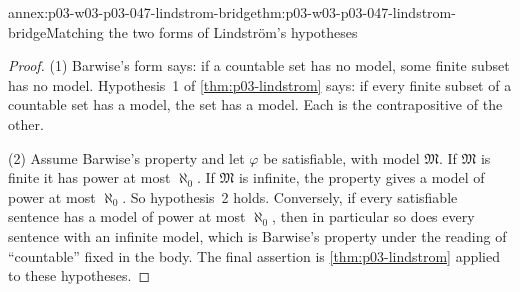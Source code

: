 \begin{annexitem}{annex:p03-w03-p03-047-lindstrom-bridge}{thm:p03-w03-p03-047-lindstrom-bridge}{Matching the two forms of Lindstr\"om's hypotheses}
\begin{proof}
(1) Barwise's form says: if a countable set has no model, some finite subset
has no model.  Hypothesis~1 of \cref{thm:p03-lindstrom} says: if every
finite subset of a countable set has a model, the set has a model.  Each is
the contrapositive of the other.

(2) Assume Barwise's property and let \(\varphi\) be satisfiable, with model
\(\mathfrak M\).  If \(\mathfrak M\) is finite it has power at most
\(\aleph_0\).  If \(\mathfrak M\) is infinite, the property gives a model of
power at most \(\aleph_0\).  So hypothesis~2 holds.  Conversely, if every
satisfiable sentence has a model of power at most \(\aleph_0\), then in
particular so does every sentence with an infinite model, which is Barwise's
property under the reading of ``countable'' fixed in the body.  The final
assertion is \cref{thm:p03-lindstrom} applied to these hypotheses.
\end{proof}
\end{annexitem}

